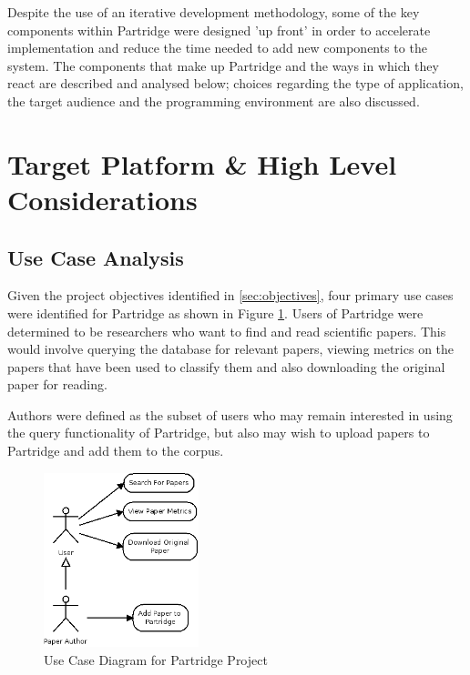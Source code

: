 %
%

Despite the use of an iterative development methodology, some of the key
components within Partridge were designed 'up front' in order to accelerate
implementation and reduce the time needed to add new components to the
system. The components that make up Partridge and the ways in which they react
are described and analysed below; choices regarding the type of application,
the target audience and the programming environment are also discussed.


\section{ Target Platform \& High Level Considerations }

\subsection{Use Case Analysis}

Given the project objectives identified in \ref{sec:objectives}, four primary
use cases were identified for Partridge as shown in Figure \ref{fig:use_cases}.
Users of Partridge were determined to be researchers who want to find and read
scientific papers. This would involve querying the database for relevant
papers, viewing metrics on the papers that have been used to classify them and
also downloading the original paper for reading. 

Authors were defined as the subset of users who may remain interested in using
the query functionality of Partridge, but also may wish to upload papers to
Partridge and add them to the corpus.

\begin{figure}[!h]
\centering
\includegraphics[width=0.4\textwidth]{images/design/use_cases.png}
\caption{Use Case Diagram for Partridge Project}
\label{fig:use_cases}
\end{figure}


